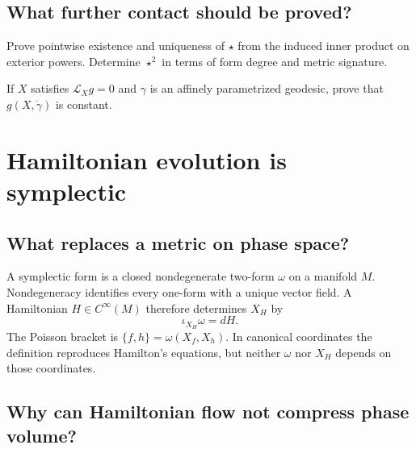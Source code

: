 \section{What further contact should be proved?}

\begin{exercise}
Prove pointwise existence and uniqueness of $\star$ from the induced inner
product on exterior powers.  Determine $\star^2$ in terms of form degree and
metric signature.
\end{exercise}

\begin{exercise}
If $X$ satisfies $\mathcal L_Xg=0$ and $\gamma$ is an affinely parametrized
geodesic, prove that $g(X,\dot\gamma)$ is constant.
\end{exercise}


\chapter{Hamiltonian evolution is symplectic}
\label{ch:symplectic}



\section{What replaces a metric on phase space?}

A symplectic form is a closed nondegenerate two-form $\omega$ on a manifold
$M$.  Nondegeneracy identifies every one-form with a unique vector field.  A
Hamiltonian $H\in C^\infty(M)$ therefore determines $X_H$ by
\[
\iota_{X_H}\omega=dH.
\]
The Poisson bracket is $\{f,h\}=\omega(X_f,X_h)$.  In canonical coordinates
the definition reproduces Hamilton's equations, but neither $\omega$ nor
$X_H$ depends on those coordinates.

\section{Why can Hamiltonian flow not compress phase volume?}

